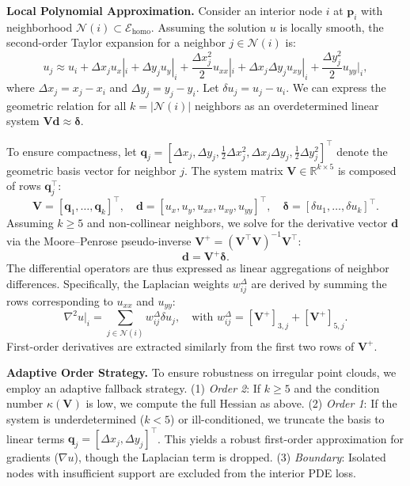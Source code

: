 \documentclass[11pt]{article}
\theoremstyle{definition}
\theoremstyle{remark}
\theoremstyle{plain}
\begin{document}
\textbf{Local Polynomial Approximation.}
Consider an interior node $i$ at $\mathbf{p}_i$ with neighborhood $\mathcal{N}(i) \subset \mathcal{E}_{\mathrm{homo}}$. Assuming the solution $u$ is locally smooth, the second-order Taylor expansion for a neighbor $j \in \mathcal{N}(i)$ is:
\begin{equation}
    u_j \approx u_i + \Delta x_j u_x|_i + \Delta y_j u_y|_i + \frac{\Delta x_j^2}{2} u_{xx}|_i + \Delta x_j \Delta y_j u_{xy}|_i + \frac{\Delta y_j^2}{2} u_{yy}|_i,
\end{equation}
where $\Delta x_j = x_j - x_i$ and $\Delta y_j = y_j - y_i$. Let $\delta u_j = u_j - u_i$. We can express the geometric relation for all $k = |\mathcal{N}(i)|$ neighbors as an overdetermined linear system $\mathbf{V} \mathbf{d} \approx \boldsymbol{\delta}$. 

To ensure compactness, let $\mathbf{q}_j = [\Delta x_j, \Delta y_j, \frac{1}{2}\Delta x_j^2, \Delta x_j \Delta y_j, \frac{1}{2}\Delta y_j^2]^\top$ denote the geometric basis vector for neighbor $j$. The system matrix $\mathbf{V} \in \mathbb{R}^{k \times 5}$ is composed of rows $\mathbf{q}_j^\top$:
\begin{equation}
    \mathbf{V} = [\mathbf{q}_1, \dots, \mathbf{q}_k]^\top, \quad
    \mathbf{d} = [u_x, u_y, u_{xx}, u_{xy}, u_{yy}]^\top, \quad
    \boldsymbol{\delta} = [\delta u_1, \dots, \delta u_k]^\top.
\end{equation}
Assuming $k \geq 5$ and non-collinear neighbors, we solve for the derivative vector $\mathbf{d}$ via the Moore--Penrose pseudo-inverse $\mathbf{V}^+ = (\mathbf{V}^\top \mathbf{V})^{-1} \mathbf{V}^\top$:
\begin{equation}
    \mathbf{d} = \mathbf{V}^+ \boldsymbol{\delta}.
\end{equation}
The differential operators are thus expressed as linear aggregations of neighbor differences. Specifically, the Laplacian weights $w_{ij}^{\Delta}$ are derived by summing the rows corresponding to $u_{xx}$ and $u_{yy}$:
\begin{equation}
    \nabla^2 u \big|_i = \sum_{j \in \mathcal{N}(i)} w_{ij}^{\Delta} \delta u_j, \quad \text{with } w_{ij}^{\Delta} = [\mathbf{V}^+]_{3,j} + [\mathbf{V}^+]_{5,j}.
\end{equation}
First-order derivatives are extracted similarly from the first two rows of $\mathbf{V}^+$.

\textbf{Adaptive Order Strategy.}
To ensure robustness on irregular point clouds, we employ an adaptive fallback strategy.
(1) \textit{Order 2}: If $k \ge 5$ and the condition number $\kappa(\mathbf{V})$ is low, we compute the full Hessian as above.
(2) \textit{Order 1}: If the system is underdetermined ($k < 5$) or ill-conditioned, we truncate the basis to linear terms $\mathbf{q}_j = [\Delta x_j, \Delta y_j]^\top$. This yields a robust first-order approximation for gradients ($\nabla u$), though the Laplacian term is dropped.
(3) \textit{Boundary}: Isolated nodes with insufficient support are excluded from the interior PDE loss.
\end{document}
